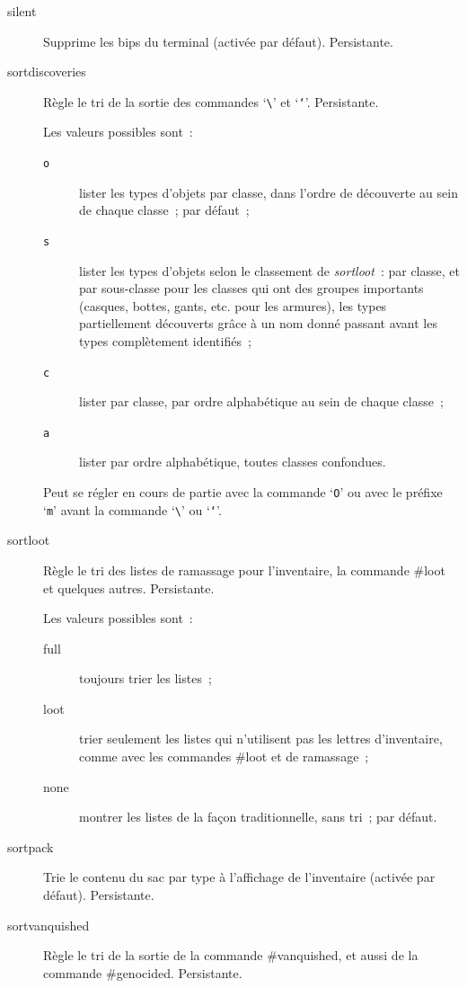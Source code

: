 \documentclass[titlepage]{article}
\begin{document}
\begin{description}
\item[{silent}]
Supprime les bips du terminal (activée par défaut).
Persistante.

\item[{sortdiscoveries}]
Règle le tri de la sortie des commandes `\texttt{\textbackslash{}}' et
`\texttt{`}'.
Persistante.


Les valeurs possibles sont~:
\begin{description}
\item[{\texttt{o}}]
lister les types d'objets par classe, dans l'ordre de découverte au sein de
chaque classe~; par défaut~;
\item[{\texttt{s}}]
lister les types d'objets selon le classement de
\textit{sortloot}~:
par classe, et par sous-classe pour les classes qui ont des groupes
importants (casques, bottes, gants, etc. pour les armures), les types
partiellement découverts grâce à un nom donné passant avant les types
complètement identifiés~;
\item[{\texttt{c}}]
lister par classe, par ordre alphabétique au sein de chaque classe~;
\item[{\texttt{a}}]
lister par ordre alphabétique, toutes classes confondues.
\end{description}
Peut se régler en cours de partie avec la commande `\texttt{O}' ou avec le
préfixe `\texttt{m}' avant la commande `\texttt{\textbackslash{}}' ou
`\texttt{`}'.

\item[{sortloot}]
Règle le tri des listes de ramassage pour l'inventaire, la commande \#loot
et quelques autres.
Persistante.


Les valeurs possibles sont~:
\begin{description}
\item[{full}]
toujours trier les listes~;
\item[{loot}]
trier seulement les listes qui n'utilisent pas les lettres d'inventaire,
comme avec les commandes \#loot et de ramassage~;
\item[{none}]
montrer les listes de la façon traditionnelle, sans tri~; par défaut.
\end{description}

\item[{sortpack}]
Trie le contenu du sac par type à l'affichage de l'inventaire (activée par
défaut).
Persistante.

\item[{sortvanquished}]
Règle le tri de la sortie de la commande \#vanquished, et aussi de la
commande \#genocided.
Persistante.



\end{description}
\end{document}
